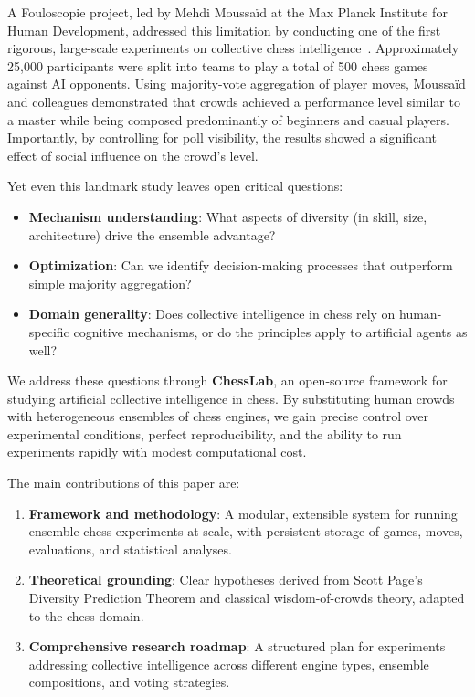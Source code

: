 \documentclass[sigconf]{aamas}
\begin{document}
A Fouloscopie project, led by Mehdi Moussaïd at the Max Planck Institute for Human Development, addressed this limitation by conducting one of the first rigorous, large-scale experiments on collective chess intelligence~\cite{moussaid2025}.
Approximately 25,000 participants were split into teams to play a total of 500 chess games against AI opponents.
Using majority-vote aggregation of player moves, Moussaïd and colleagues demonstrated that crowds achieved a performance level similar to a master while being composed predominantly of beginners and casual players.
Importantly, by controlling for poll visibility, the results showed a significant effect of social influence on the crowd's level.

Yet even this landmark study leaves open critical questions:
\begin{itemize}
  \item \textbf{Mechanism understanding}: What aspects of diversity (in skill, size, architecture) drive the ensemble advantage?
  \item \textbf{Optimization}: Can we identify decision-making processes that outperform simple majority aggregation?
  \item \textbf{Domain generality}: Does collective intelligence in chess rely on human-specific cognitive mechanisms, or do the principles apply to artificial agents as well?
\end{itemize}

We address these questions through \textbf{ChessLab}, an open-source framework for studying artificial collective intelligence in chess.
By substituting human crowds with heterogeneous ensembles of chess engines, we gain precise control over experimental conditions, perfect reproducibility, and the ability to run experiments rapidly with modest computational cost.

The main contributions of this paper are:
\begin{enumerate}
  \item \textbf{Framework and methodology}: A modular, extensible system for running ensemble chess experiments at scale, with persistent storage of games, moves, evaluations, and statistical analyses.
  \item \textbf{Theoretical grounding}: Clear hypotheses derived from Scott Page's Diversity Prediction Theorem and classical wisdom-of-crowds theory, adapted to the chess domain.
  \item \textbf{Comprehensive research roadmap}: A structured plan for experiments addressing collective intelligence across different engine types, ensemble compositions, and voting strategies.
\end{enumerate}
\end{document}
